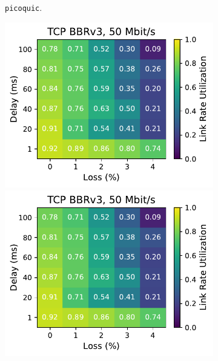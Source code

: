 \begin{figure}[ht]
\begin{subfigure}[b]{0.22\linewidth}
        \caption{\texttt{picoquic}.}
    \end{subfigure}
    \begin{subfigure}[b]{1cm}
        \includegraphics[width=\linewidth,trim={8cm 0 0 0},clip]{figures/heatmaps/heatmap_tcp_bbr3_50mbps.pdf}
        \vspace*{0.22cm}
        \includegraphics[width=\linewidth,trim={8cm 0 0 0},clip]{figures/heatmaps/heatmap_tcp_bbr3_50mbps.pdf}
        \vspace*{0.22cm}

\end{subfigure}
\end{figure}
